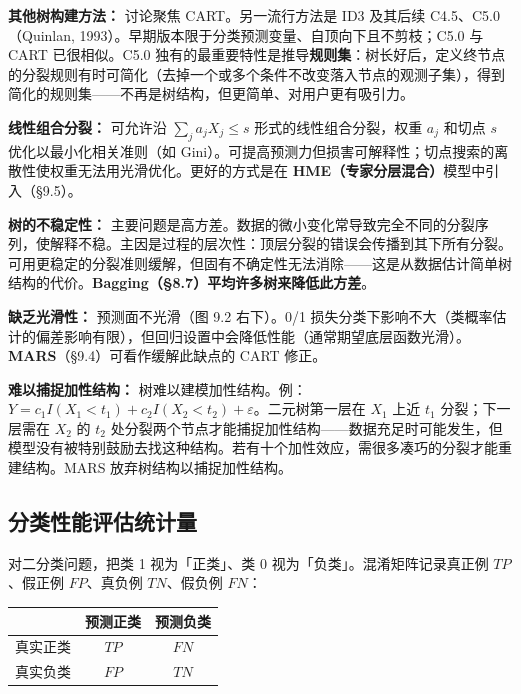 \textbf{其他树构建方法：} 讨论聚焦 CART。另一流行方法是 ID3 及其后续 C4.5、C5.0（Quinlan, 1993）。早期版本限于分类预测变量、自顶向下且不剪枝；C5.0 与 CART 已很相似。C5.0 独有的最重要特性是推导\textbf{规则集}：树长好后，定义终节点的分裂规则有时可简化（去掉一个或多个条件不改变落入节点的观测子集），得到简化的规则集——不再是树结构，但更简单、对用户更有吸引力。

\textbf{线性组合分裂：} 可允许沿 $\sum_j a_j X_j \le s$ 形式的线性组合分裂，权重 $a_j$ 和切点 $s$ 优化以最小化相关准则（如 Gini）。可提高预测力但损害可解释性；切点搜索的离散性使权重无法用光滑优化。更好的方式是在 \textbf{HME（专家分层混合）}模型中引入（§9.5）。

\textbf{树的不稳定性：} 主要问题是高方差。数据的微小变化常导致完全不同的分裂序列，使解释不稳。主因是过程的层次性：顶层分裂的错误会传播到其下所有分裂。可用更稳定的分裂准则缓解，但固有不确定性无法消除——这是从数据估计简单树结构的代价。\textbf{Bagging（§8.7）平均许多树来降低此方差}。

\textbf{缺乏光滑性：} 预测面不光滑（图 9.2 右下）。0/1 损失分类下影响不大（类概率估计的偏差影响有限），但回归设置中会降低性能（通常期望底层函数光滑）。\textbf{MARS}（§9.4）可看作缓解此缺点的 CART 修正。

\textbf{难以捕捉加性结构：} 树难以建模加性结构。例：$Y = c_1 I(X_1 < t_1) + c_2 I(X_2 < t_2) + \varepsilon$。二元树第一层在 $X_1$ 上近 $t_1$ 分裂；下一层需在 $X_2$ 的 $t_2$ 处分裂两个节点才能捕捉加性结构——数据充足时可能发生，但模型没有被特别鼓励去找这种结构。若有十个加性效应，需很多凑巧的分裂才能重建结构。MARS 放弃树结构以捕捉加性结构。

\subsection{分类性能评估统计量}

对二分类问题，把类 1 视为「正类」、类 0 视为「负类」。混淆矩阵记录真正例 $TP$、假正例 $FP$、真负例 $TN$、假负例 $FN$：

\begin{center}
\begin{tabular}{ccc}
\toprule
 & 预测正类 & 预测负类 \\
\midrule
真实正类 & $TP$ & $FN$ \\
真实负类 & $FP$ & $TN$ \\
\bottomrule
\end{tabular}
\end{center}

